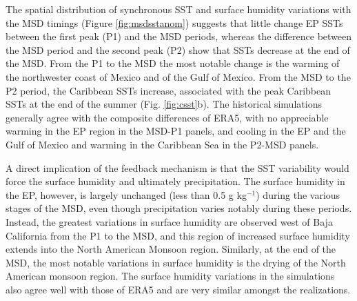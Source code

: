 


The spatial distribution of synchronous SST and surface humidity variations with the MSD timings  (Figure \ref{fig:msdsstanom}) suggests that little change EP SSTs between the first peak (P1) and the  MSD periods, whereas the difference between the MSD period and the second peak (P2) show that SSTs decrease at the end of the MSD. From the P1 to the MSD the most notable change is the warming of the northwester coast of Mexico and of the Gulf of Mexico.
From the MSD to the P2 period, the Caribbean SSTs increase, associated with the peak Caribbean SSTs  at the end of the summer (Fig. \ref{fig:csst}b).
The historical simulations generally agree with the composite differences of ERA5, with no appreciable warming in the EP region in the MSD-P1 panels, and cooling in the EP and the Gulf of Mexico and warming in the Caribbean Sea in the P2-MSD panels.




A direct implication of the feedback mechanism is that the SST variability would force the surface humidity and ultimately precipitation. The surface humidity in the EP, however, is largely unchanged (less than 0.5 g kg$^{-1}$) during the various stages of the MSD, even though precipitation varies notably during these periods. Instead, the greatest variations in surface humidity are observed west of Baja California from the P1 to the MSD, and this region of increased surface humidity extends into the North American Monsoon region. Similarly, at the end of the MSD, the most notable variations in surface humidity is the drying of the North American monsoon region.
 The surface humidity variations in the simulations also agree well with those of ERA5 and are very similar amongst the realizations.


